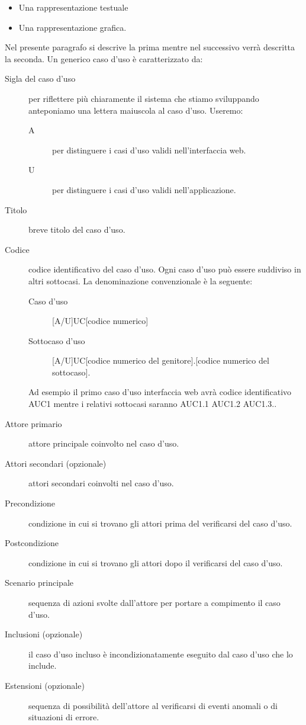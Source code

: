 \documentclass[../../norme-di-progetto.tex]{subfiles}
\begin{document}
\begin{itemize}
  \item Una rappresentazione testuale
  \item Una rappresentazione grafica.
\end{itemize}

Nel presente paragrafo si descrive la prima mentre nel successivo verrà descritta la seconda.
Un generico caso d'uso è caratterizzato da:
\begin{description}
  \item [Sigla del caso d'uso] per riflettere più chiaramente il sistema che stiamo sviluppando anteponiamo una lettera maiuscola al caso d'uso.
        Useremo:
        \begin{description}
          \item [A] per distinguere i casi d'uso validi nell'interfaccia web.
          \item [U] per distinguere i casi d'uso validi nell'applicazione.
        \end{description}
  \item [Titolo] breve titolo del caso d'uso.
  \item [Codice] codice identificativo del caso d'uso. Ogni caso d'uso può essere suddiviso in altri sottocasi. La denominazione convenzionale è la seguente:
        \begin{description}
          \item [Caso d'uso] [A/U]UC[codice numerico]
          \item [Sottocaso d'uso] [A/U]UC[codice numerico del genitore].[codice numerico del sottocaso].
        \end{description}
        Ad esempio il primo caso d'uso interfaccia web avrà codice identificativo AUC1 mentre i relativi sottocasi saranno AUC1.1 AUC1.2 AUC1.3..
  \item [Attore primario] attore principale coinvolto nel caso d'uso.
  \item [Attori secondari (opzionale)] attori secondari coinvolti nel caso d'uso.
  \item [Precondizione] condizione in cui si trovano gli attori prima del verificarsi del caso d'uso.
  \item [Postcondizione] condizione in cui si trovano gli attori dopo il verificarsi del caso d'uso.
  \item [Scenario principale] sequenza di azioni svolte dall'attore per portare a compimento il caso d'uso.
  \item [Inclusioni (opzionale)] il caso d'uso incluso è incondizionatamente eseguito dal caso d'uso che lo include.
  \item [Estensioni (opzionale)] sequenza di possibilità dell'attore al verificarsi di eventi anomali o di situazioni di errore.
\end{description}
\end{document}
